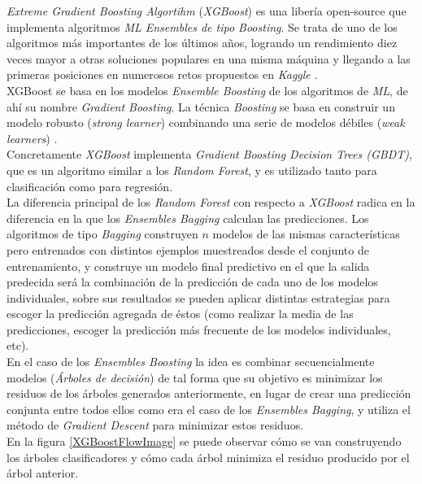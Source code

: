             
            \textit{Extreme Gradient Boosting Algortihm} (\textit{XGBoost}) es una libería open-source que implementa algoritmos \textit{ML Ensembles de tipo Boosting}. Se trata de uno de los algoritmos más importantes de los últimos años, logrando un rendimiento diez veces mayor a otras soluciones populares en una misma máquina y llegando a las primeras posiciones en numerosos retos propuestos en \textit{Kaggle} \cite{XGBoostTutorial}.\\

            XGBoost se basa en los modelos \textit{Ensemble Boosting} de los algoritmos de \textit{ML}, de ahí su nombre \textit{Gradient Boosting}. La técnica \textit{Boosting} se basa en construir un modelo robusto (\textit{strong learner}) combinando una serie de modelos débiles (\textit{weak learners}) \cite{NvidiaXGBoost}.\\


            Concretamente \textit{XGBoost} implementa \textit{Gradient Boosting Decision Trees (GBDT)}, que es un algoritmo similar a los \textit{Random Forest}, y es utilizado tanto para clasificación como para regresión.\\

            La diferencia principal de los \textit{Random Forest} con respecto a \textit{XGBoost} radica en la diferencia en la que los \textit{Ensembles Bagging} calculan las predicciones. Los algoritmos de tipo \textit{Bagging} construyen $n$ modelos de las mismas características pero entrenados con distintos ejemplos muestreados desde el conjunto de entrenamiento, y construye un modelo final predictivo en el que la salida predecida será la combinación de la predicción de cada uno de los modelos individuales, sobre sus resultados se pueden aplicar distintas estrategias para escoger la predicción agregada de éstos (como realizar la media de las predicciones, escoger la predicción más frecuente de los modelos individuales, etc).\\

            En el caso de los \textit{Ensembles Boosting} la idea es combinar secuencialmente modelos (\textit{Árboles de decisión}) de tal forma que su objetivo es minimizar los residuos de los árboles generados anteriormente, en lugar de crear una predicción conjunta entre todos ellos como era el caso de los \textit{Ensembles Bagging}, y utiliza el método de \textit{Gradient Descent} para minimizar estos residuos.\\


            En la figura \ref{XGBoostFlowImage} se puede observar cómo se van construyendo los árboles clasificadores y cómo cada árbol minimiza el residuo producido por el árbol anterior.\\


